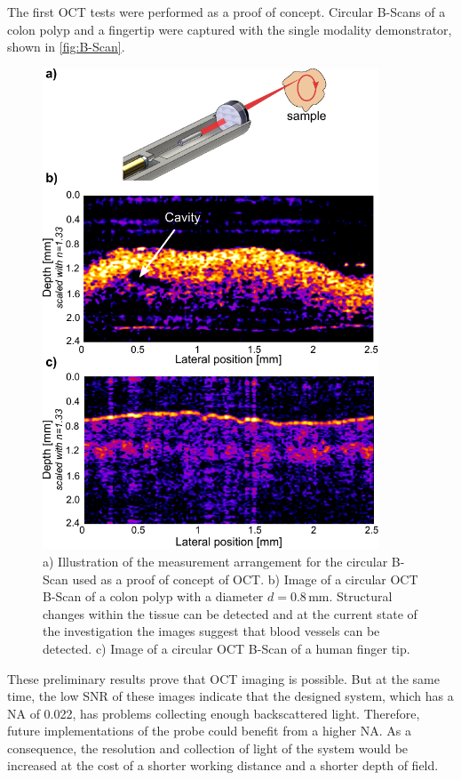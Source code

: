 The first OCT tests were performed as a proof of concept. Circular B-Scans of a colon polyp and a fingertip were captured with the single modality demonstrator, shown in \autoref{fig:B-Scan}. 
\begin{figure}[h!]\centering \includegraphics[width=10cm]{figures/50_Measurements/oct/OCT_Measurement_arrangement.pdf}
      \caption{a) Illustration of the measurement arrangement for the circular B-Scan used as a proof of concept of OCT. b) Image of a circular OCT B-Scan of a colon polyp with a diameter $d=0.8\,\text{mm}$. Structural changes within the tissue can be detected and at the current state of the investigation the images suggest that blood vessels can be detected.
      c) Image of a circular OCT B-Scan of a human finger tip.}
      \label{fig:B-Scan}
\end{figure}
These preliminary results prove that OCT imaging is possible. But at the same time, the low SNR of these images indicate that the designed system, which has a NA of 0.022, has problems collecting enough backscattered light. Therefore, future implementations of the probe could benefit from a higher NA. As a consequence, the resolution and collection of light of the system would be increased at the cost of a shorter working distance and a shorter depth of field. 